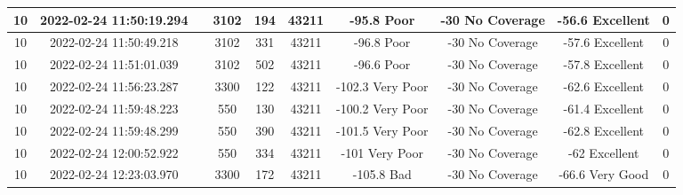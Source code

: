 \begin{longtable*}{|c|c|c|c|c|c|c|c|c|c|}
10&2022-02-24 11:50:19.294&&3102&194&43211& -95.8     Poor        & -30       No Coverage & -56.6     Excellent   & 0\\\hline
{}10&2022-02-24 11:50:49.218&&3102&331&43211& -96.8     Poor        & -30       No Coverage & -57.6     Excellent   & 0\\\hline
{}10&2022-02-24 11:51:01.039&&3102&502&43211& -96.6     Poor        & -30       No Coverage & -57.8     Excellent   & 0\\\hline
{}10&2022-02-24 11:56:23.287&&3300&122&43211& -102.3    Very Poor   & -30       No Coverage & -62.6     Excellent   & 0\\\hline
{}10&2022-02-24 11:59:48.223&&550&130&43211& -100.2    Very Poor   & -30       No Coverage & -61.4     Excellent   & 0\\\hline
{}10&2022-02-24 11:59:48.299&&550&390&43211& -101.5    Very Poor   & -30       No Coverage & -62.8     Excellent   & 0\\\hline
{}10&2022-02-24 12:00:52.922&&550&334&43211& -101      Very Poor   & -30       No Coverage & -62       Excellent   & 0\\\hline
{}10&2022-02-24 12:23:03.970&&3300&172&43211& -105.8    Bad         & -30       No Coverage & -66.6     Very Good   & 0\\\hline

\end{longtable*}
